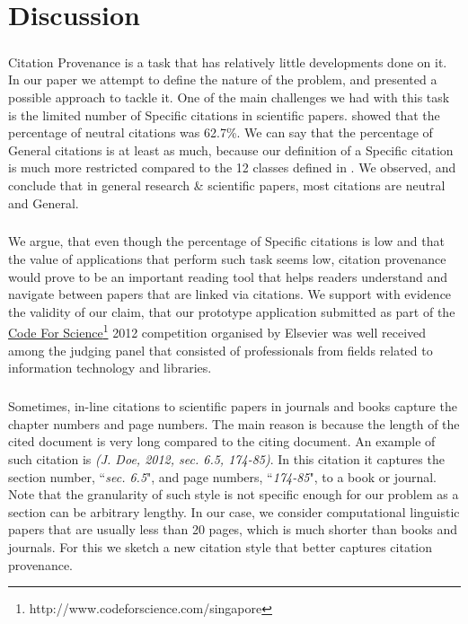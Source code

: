 \chapter{Discussion}
\label{discussion}
\paragraph{}
Citation Provenance is a task that has relatively little developments done on it. In our paper we attempt to define the nature of the problem, and presented a possible approach to tackle it. One of the main challenges we had with this task is the limited number of Specific citations in scientific papers. \cite{teufel2009annotation} showed that the percentage of neutral citations was 62.7\%. We can say that the percentage of General citations is at least as much, because our definition of a Specific citation is much more restricted compared to the 12 classes defined in \cite{teufel2009annotation}. We observed, and conclude that in general research \& scientific papers, most citations are neutral and General.

\paragraph{}
We argue, that even though the percentage of Specific citations is low and that the value of applications that perform such task seems low, citation provenance would prove to be an important reading tool that helps readers understand and navigate between papers that are linked via citations. We support with evidence the validity of our claim, that our prototype application submitted as part of the \url{Code For Science}\footnote{http://www.codeforscience.com/singapore} 2012 competition organised by Elsevier was well received among the judging panel that consisted of professionals from fields related to information technology and libraries.

\paragraph{}
Sometimes, in-line citations to scientific papers in journals and books capture the chapter numbers and page numbers. The main reason is because the length of the cited document is very long compared to the citing document. An example of such citation is \textit{(J. Doe, 2012, sec. 6.5, 174-85)}. In this citation it captures the section number, ``\textit{sec. 6.5}", and page numbers, ``\textit{174-85}", to a book or journal. Note that the granularity of such style is not specific enough for our problem as a section can be arbitrary lengthy. In our case, we consider computational linguistic papers that are usually less than 20 pages, which is much shorter than books and journals. For this we sketch a new citation style that better captures citation provenance.

